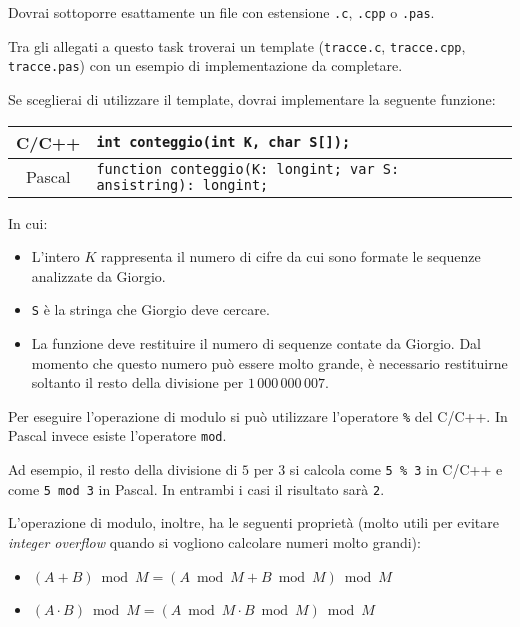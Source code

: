 \Implementation
Dovrai sottoporre esattamente un file con estensione \texttt{.c}, \texttt{.cpp} o \texttt{.pas}.

\begin{warning}
Tra gli allegati a questo task troverai un template (\texttt{tracce.c}, \texttt{tracce.cpp}, \texttt{tracce.pas}) con un esempio di implementazione da completare.
\end{warning}

Se sceglierai di utilizzare il template, dovrai implementare la seguente funzione:
\begin{center}\begin{tabularx}{\textwidth}{|c|X|}
\hline
C/C++  & \verb|int conteggio(int K, char S[]);|\\
\hline
Pascal & \verb|function conteggio(K: longint; var S: ansistring): longint;|\\
\hline
\end{tabularx}\end{center}
In cui:
\begin{itemize}[nolistsep]
  \item L'intero $K$ rappresenta il numero di cifre da cui sono formate le sequenze analizzate da Giorgio.
  \item \texttt{S} è la stringa che Giorgio deve cercare.
  \item La funzione deve restituire il numero di sequenze contate da Giorgio. Dal momento che questo numero può essere molto grande, è necessario restituirne soltanto il resto della divisione per $1\,000\,000\,007$.
\end{itemize}

\begin{warning}
  Per eseguire l'operazione di modulo si può utilizzare l'operatore \texttt{\%} del C/C++. In Pascal invece esiste l'operatore \texttt{mod}.

  Ad esempio, il resto della divisione di $5$ per $3$ si calcola come \texttt{5 \% 3} in C/C++ e come \texttt{5 mod 3} in Pascal. In entrambi i casi il risultato sarà \texttt{2}.

  L'operazione di modulo, inoltre, ha le seguenti proprietà (molto utili per evitare \emph{integer overflow} quando si vogliono calcolare numeri molto grandi):
  \begin{itemize}[nolistsep]
    \item $(A + B) \bmod M = (A \bmod M + B \bmod M) \bmod M$
    \item $(A \cdot B) \bmod M = (A \bmod M \cdot B \bmod M) \bmod M$
  \end{itemize}
\end{warning}

